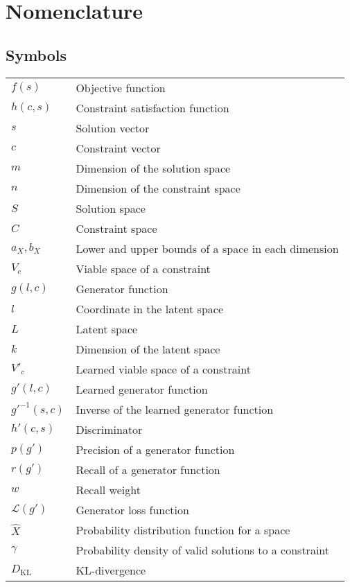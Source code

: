 \documentclass[../main.tex]{subfiles}
\begin{document}
\chapter*{Nomenclature}

\section*{Symbols}

\begin{longtable}[l]{ l l }
    $f(s)$ & Objective function \\ 
    $h(c, s)$ & Constraint satisfaction function \\  
    $s$ & Solution vector \\
    $c$ & Constraint vector \\
    $m$ & Dimension of the solution space \\
    $n$ & Dimension of the constraint space \\
    $S$ & Solution space \\
    $C$ & Constraint space \\
    $a_X, b_X$ & Lower and upper bounds of a space in each dimension \\
    $V_c$ & Viable space of a constraint \\
    $g(l, c)$ & Generator function \\
    $l$ & Coordinate in the latent space \\
    $L$ & Latent space \\
    $k$ & Dimension of the latent space \\
    $V'_c$ & Learned viable space of a constraint \\
    $g'(l, c)$ & Learned generator function \\
    $g'^{-1}(s, c)$ & Inverse of the learned generator function \\
    $h'(c,s)$ & Discriminator \\
    $p(g')$ & Precision of a generator function \\
    $r(g')$ & Recall of a generator function \\
    $w$ & Recall weight \\
    $\mathcal{L}(g')$ & Generator loss function \\
    $\hat{X}$ & Probability distribution function for a space \\
    $\gamma$ & Probability density of valid solutions to a constraint \\
    $D_\text{KL}$ & KL-divergence \\

\end{longtable}
\end{document}
